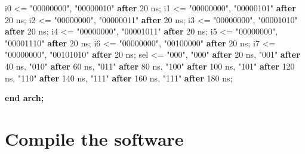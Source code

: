 \documentclass[11pt]{article}
\newenvironment{Shaded}{}{}
\newcommand{\KeywordTok}[1]{\textcolor[rgb]{0.00,0.44,0.13}{\textbf{{#1}}}}
\newcommand{\DataTypeTok}[1]{\textcolor[rgb]{0.56,0.13,0.00}{{#1}}}
\newcommand{\DecValTok}[1]{\textcolor[rgb]{0.25,0.63,0.44}{{#1}}}
\newcommand{\StringTok}[1]{\textcolor[rgb]{0.25,0.44,0.63}{{#1}}}
\newcommand{\OtherTok}[1]{\textcolor[rgb]{0.00,0.44,0.13}{{#1}}}
\newcommand{\ErrorTok}[1]{\textcolor[rgb]{1.00,0.00,0.00}{\textbf{{#1}}}}
\newcommand{\NormalTok}[1]{{#1}}
\begin{document}
\begin{Shaded}
\begin{Highlighting}[]
\NormalTok{    i0 }\OtherTok{\textless{}=} \StringTok{"00000000"}\OtherTok{,} \StringTok{"00000010"} \KeywordTok{after} \DecValTok{20} \DataTypeTok{ns}\NormalTok{;}
\NormalTok{    i1 }\OtherTok{\textless{}=} \StringTok{"00000000"}\OtherTok{,} \StringTok{"00000101"} \KeywordTok{after} \DecValTok{20} \DataTypeTok{ns}\NormalTok{;}
\NormalTok{    i2 }\OtherTok{\textless{}=} \StringTok{"00000000"}\OtherTok{,} \StringTok{"00000011"} \KeywordTok{after} \DecValTok{20} \DataTypeTok{ns}\NormalTok{;}
\NormalTok{    i3 }\OtherTok{\textless{}=} \StringTok{"00000000"}\OtherTok{,} \StringTok{"00001010"} \KeywordTok{after} \DecValTok{20} \DataTypeTok{ns}\NormalTok{;}
\NormalTok{    i4 }\OtherTok{\textless{}=} \StringTok{"00000000"}\OtherTok{,} \StringTok{"00001011"} \KeywordTok{after} \DecValTok{20} \DataTypeTok{ns}\NormalTok{;}
\NormalTok{    i5 }\OtherTok{\textless{}=} \StringTok{"00000000"}\OtherTok{,} \StringTok{"00001110"} \KeywordTok{after} \DecValTok{20} \DataTypeTok{ns}\NormalTok{;}
\NormalTok{    i6 }\OtherTok{\textless{}=} \StringTok{"00000000"}\OtherTok{,} \StringTok{"00100000"} \KeywordTok{after} \DecValTok{20} \DataTypeTok{ns}\NormalTok{;}
\NormalTok{    i7 }\OtherTok{\textless{}=} \StringTok{"00000000"}\OtherTok{,} \StringTok{"00101010"} \KeywordTok{after} \DecValTok{20} \DataTypeTok{ns}\NormalTok{;}
\NormalTok{    sel }\OtherTok{\textless{}=}  \StringTok{"000"}\OtherTok{,}
            \StringTok{"000"} \KeywordTok{after} \DecValTok{20} \DataTypeTok{ns}\OtherTok{,}
            \StringTok{"001"} \KeywordTok{after} \DecValTok{40} \DataTypeTok{ns}\OtherTok{,}
            \StringTok{"010"} \KeywordTok{after} \DecValTok{60} \DataTypeTok{ns}\OtherTok{,}
            \StringTok{"011"} \KeywordTok{after} \DecValTok{80} \DataTypeTok{ns}\OtherTok{,}
            \StringTok{"100"} \KeywordTok{after} \DecValTok{100} \DataTypeTok{ns}\OtherTok{,}
            \StringTok{"101"} \KeywordTok{after} \DecValTok{120} \DataTypeTok{ns}\OtherTok{,}
            \StringTok{"110"} \KeywordTok{after} \DecValTok{140} \DataTypeTok{ns}\OtherTok{,}
            \StringTok{"111"} \KeywordTok{after} \DecValTok{160} \DataTypeTok{ns}\OtherTok{,}
            \StringTok{"111"} \KeywordTok{after} \DecValTok{180} \DataTypeTok{ns}\NormalTok{;}

\ErrorTok{end arch;}
\end{Highlighting}
\end{Shaded}

    \hypertarget{compile-the-software}{%
\section{Compile the software}\label{compile-the-software}}
\end{document}
